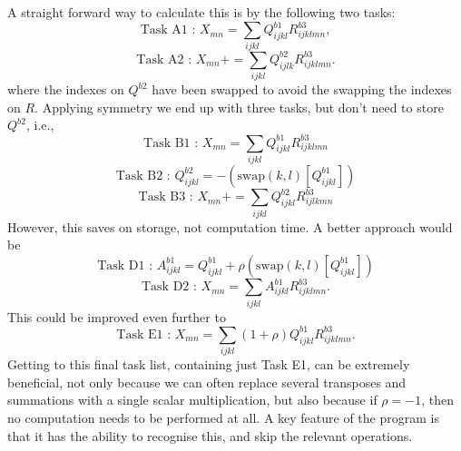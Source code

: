 \noindent A straight forward way to calculate this is by the following two tasks:
\begin{equation*}
\text{Task A1\ : \ \ \  \ } X_{mn} = \sum_{ijkl}  Q^{b1}_{ijkl}R^{b3}_{ijklmn},
\end{equation*}                                                             
\begin{equation*}                                                           
\text{Task A2\ : \ \ \  \ } X_{mn} += \sum_{ijkl} Q^{b2}_{ijlk}R^{b3}_{ijklmn}.
\end{equation*}
where the indexes on $Q^{b2}$ have been swapped to avoid the swapping the indexes on $R$.
Applying symmetry we end up with three tasks, but don't need to store $Q^{b2}$, i.e., 
\begin{equation*}
\text{Task B1\ : \ \ \  \ } X_{mn} = \sum_{ijkl}  Q^{b1}_{ijkl}R^{b3}_{ijklmn}
\end{equation*}                                                             
\begin{equation*}                                                           
\text{Task B2\ : \ \ \  \ } Q^{b2}_{ijkl} = - (\text{swap}(k,l)[ Q^{b1}_{ijkl}])
\end{equation*}
\begin{equation*}                                                           
\text{Task B3\ : \ \ \  \ } X_{mn} += \sum_{ijkl} Q^{b2}_{ijkl}R^{b3}_{ijlkmn}
\end{equation*}
However, this saves on storage, not computation time. A better approach would be
\begin{equation*}                                                           
\text{Task D1\ : \ \ \  \ } A^{b1}_{ijkl} =  Q^{b1}_{ijkl} + \rho(\text{swap}(k,l)[Q^{b1}_{ijkl}] ) 
\end{equation*}
\begin{equation*}                                                           
\text{Task D2\ : \ \ \  \ } X_{mn} = \sum_{ijkl} A^{b1}_{ijkl}R^{b3}_{ijklmn}.
\end{equation*}
This could be improved even further to
\begin{equation*}                                                           
\text{Task E1\ : \ \ \  \ } X_{mn} = \sum_{ijkl} (1+\rho) Q^{b1}_{ijkl}R^{b3}_{ijklmn}.
\end{equation*}
\noindent Getting to this final task list, containing just Task E1, can be
extremely beneficial, not only because we can often replace several transposes
and summations with a single scalar multiplication, but also because if $\rho =
-1$, then no computation needs to be performed at all. A key feature of the program is
that it has the ability to recognise this, and skip the relevant operations.\\  

